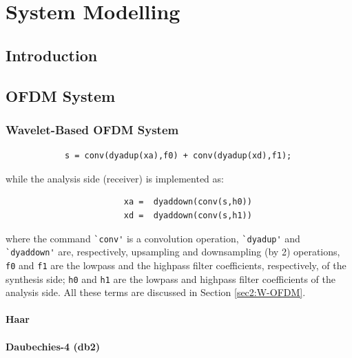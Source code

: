 \chapter{System Modelling} \label{chap3}
	\section{Introduction}
	\section{OFDM System} \label{sec3:OFDM System specification}
		\subsection{Wavelet-Based OFDM System}
			\begin{verbatim}
			s = conv(dyadup(xa),f0) + conv(dyadup(xd),f1);
			\end{verbatim}
			while the analysis side (receiver) is implemented as:
						\begin{verbatim}
						xa =  dyaddown(conv(s,h0))
						xd =  dyaddown(conv(s,h1))
						\end{verbatim}
			where the command \verb|`conv'| is a convolution operation, \verb|`dyadup'| and \verb|`dyaddown'|  are, respectively, upsampling and downsampling (by 2) operations, \verb|f0| and \verb|f1| are the lowpass and the highpass filter coefficients, respectively, of the synthesis side; \verb|h0| and \verb|h1| are the lowpass and highpass filter coefficients of the analysis side. All these terms are discussed in Section \ref{sec2:W-OFDM}.
			\subsubsection{Haar}
			\subsubsection{Daubechies-4 (db2)}
